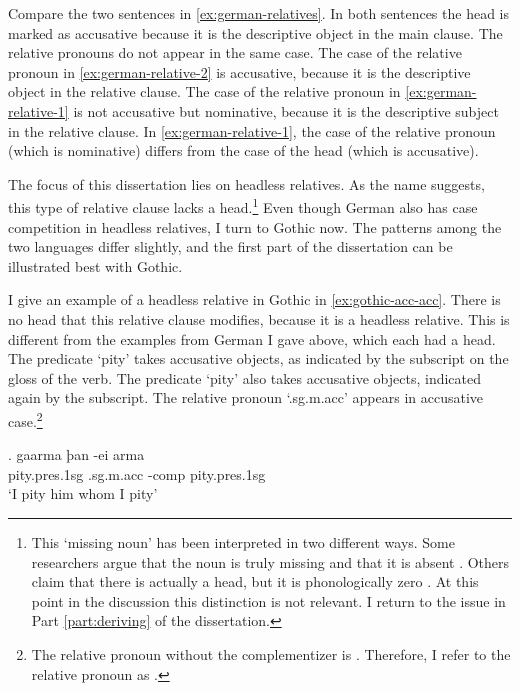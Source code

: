 Compare the two sentences in \ref{ex:german-relatives}. In both sentences the head is marked as accusative because it is the descriptive object in the main clause. The relative pronouns do not appear in the same case. The case of the relative pronoun in \ref{ex:german-relative-2} is accusative, because it is the descriptive object in the relative clause. The case of the relative pronoun in \ref{ex:german-relative-1} is not accusative but nominative, because it is the descriptive subject in the relative clause. In \ref{ex:german-relative-1}, the case of the relative pronoun (which is nominative) differs from the case of the head (which is accusative).

The focus of this dissertation lies on headless relatives. As the name suggests, this type of relative clause lacks a head.\footnote{
This `missing noun' has been interpreted in two different ways. Some researchers argue that the noun is truly missing and that it is absent \citep[cf.][]{citko2005,vanriemsdijk2006}. Others claim that there is actually a head, but it is phonologically zero \citep[cf.][]{bresnan1978,groos1981,grosu2003}. At this point in the discussion this distinction is not relevant. I return to the issue in Part \ref{part:deriving} of the dissertation.
}
Even though German also has case competition in headless relatives, I turn to Gothic now. The patterns among the two languages differ slightly, and the first part of the dissertation can be illustrated best with Gothic.

I give an example of a headless relative in Gothic in \ref{ex:gothic-acc-acc}.
There is no head that this relative clause modifies, because it is a headless relative. This is different from the examples from German I gave above, which each had a head.
The predicate  `pity' takes accusative objects, as indicated by the subscript on the gloss of the verb. The predicate  `pity' also takes accusative objects, indicated again by the subscript.
The relative pronoun  `.\ac{sg}.\ac{m}.\ac{acc}' appears in accusative case.\footnote{
The relative pronoun without the complementizer  is . Therefore, I refer to the relative pronoun as .
}

\exg. gaarma þan -ei arma\\
 pity.\ac{pres}.1\ac{sg}\scsub{[acc]} .\ac{sg}.\ac{m}.\ac{acc} -\ac{comp} pity.\ac{pres}.1\ac{sg}\scsub{[acc]}\\
 `I pity him whom I pity' \label{ex:gothic-acc-acc}

